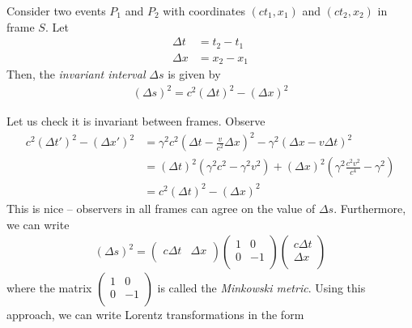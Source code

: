 \documentclass{../template/note}
\begin{document}
    
    \begin{definition}
        Consider two events \(P_1\) and \(P_2\) with coordinates \((ct_1, x_1)\) and \((ct_2, x_2)\) in frame \(S\). Let
        \begin{align*}
            \Delta t &= t_2 - t_1 \\
            \Delta x &= x_2 - x_1 
        \end{align*}
        Then, the \emph{invariant interval} \(\Delta s\) is given by
        \begin{align*}
            (\Delta s)^2 = c^2 (\Delta t)^2 - (\Delta x)^2
        \end{align*}
    \end{definition}
    Let us check it is invariant between frames. Observe
    \begin{align*}
        c^2(\Delta t')^2 - (\Delta x')^2 &= \gamma^2c^2\left(\Delta t - \frac{v}{c^2}\Delta x\right)^2 - \gamma^2(\Delta x - v\Delta t)^2 \\
        &= (\Delta t)^2(\gamma^2c^2-\gamma^2v^2) + (\Delta x)^2\left(\gamma^2 \frac{c^2v^2}{c^4}-\gamma^2\right) \\
        &= c^2(\Delta t)^2 - (\Delta x)^2
    \end{align*}
    This is nice -- observers in all frames can agree on the value of \(\Delta s\). Furthermore, we can write
    \begin{align*}
        (\Delta s)^2 = \begin{pmatrix}
         c\Delta t & \Delta x \\
        \end{pmatrix} \begin{pmatrix}
         1 & 0 \\
         0 & -1 \\
        \end{pmatrix}\begin{pmatrix}
         c\Delta t \\
         \Delta x \\
        \end{pmatrix}
    \end{align*}
    where the matrix \(\begin{pmatrix}
     1 & 0 \\
     0 & -1 \\
    \end{pmatrix}\) is called the \emph{Minkowski metric}. Using this approach, we can write Lorentz transformations in the form
\end{document}
